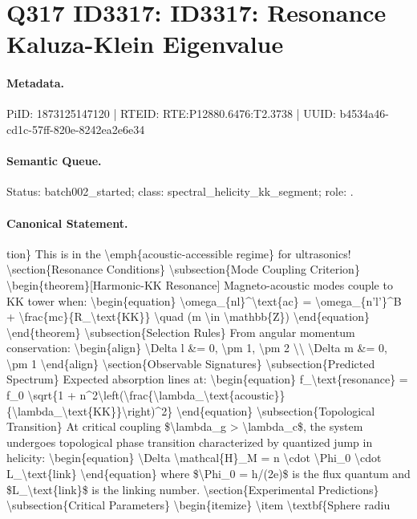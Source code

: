 \section*{Q317 ID3317: ID3317: Resonance Kaluza-Klein Eigenvalue}
\paragraph{Metadata.}
PiID: 1873125147120 | RTEID: RTE:P12880.6476:T2.3738 | UUID: b4534a46-cd1c-57ff-820e-8242ea2e6e34

\paragraph{Semantic Queue.}
Status: batch002\_started; class: spectral\_helicity\_kk\_segment; role: .

\paragraph{Canonical Statement.}
tion\} This is in the \textbackslash{}emph\{acoustic-accessible regime\} for ultrasonics! \textbackslash{}section\{Resonance Conditions\} \textbackslash{}subsection\{Mode Coupling Criterion\} \textbackslash{}begin\{theorem\}[Harmonic-KK Resonance] Magneto-acoustic modes couple to KK tower when: \textbackslash{}begin\{equation\} \textbackslash{}omega\_\{nl\}\textasciicircum{}\textbackslash{}text\{ac\} = \textbackslash{}omega\_\{n'l'\}\textasciicircum{}B + \textbackslash{}frac\{mc\}\{R\_\textbackslash{}text\{KK\}\} \textbackslash{}quad (m \textbackslash{}in \textbackslash{}mathbb\{Z\}) \textbackslash{}end\{equation\} \textbackslash{}end\{theorem\} \textbackslash{}subsection\{Selection Rules\} From angular momentum conservation: \textbackslash{}begin\{align\} \textbackslash{}Delta l \&= 0, \textbackslash{}pm 1, \textbackslash{}pm 2 \textbackslash{}\textbackslash{} \textbackslash{}Delta m \&= 0, \textbackslash{}pm 1 \textbackslash{}end\{align\} \textbackslash{}section\{Observable Signatures\} \textbackslash{}subsection\{Predicted Spectrum\} Expected absorption lines at: \textbackslash{}begin\{equation\} f\_\textbackslash{}text\{resonance\} = f\_0 \textbackslash{}sqrt\{1 + n\textasciicircum{}2\textbackslash{}left(\textbackslash{}frac\{\textbackslash{}lambda\_\textbackslash{}text\{acoustic\}\}\{\textbackslash{}lambda\_\textbackslash{}text\{KK\}\}\textbackslash{}right)\textasciicircum{}2\} \textbackslash{}end\{equation\} \textbackslash{}subsection\{Topological Transition\} At critical coupling \$\textbackslash{}lambda\_g > \textbackslash{}lambda\_c\$, the system undergoes topological phase transition characterized by quantized jump in helicity: \textbackslash{}begin\{equation\} \textbackslash{}Delta \textbackslash{}mathcal\{H\}\_M = n \textbackslash{}cdot \textbackslash{}Phi\_0 \textbackslash{}cdot L\_\textbackslash{}text\{link\} \textbackslash{}end\{equation\} where \$\textbackslash{}Phi\_0 = h/(2e)\$ is the flux quantum and \$L\_\textbackslash{}text\{link\}\$ is the linking number. \textbackslash{}section\{Experimental Predictions\} \textbackslash{}subsection\{Critical Parameters\} \textbackslash{}begin\{itemize\} \textbackslash{}item \textbackslash{}textbf\{Sphere radiu

